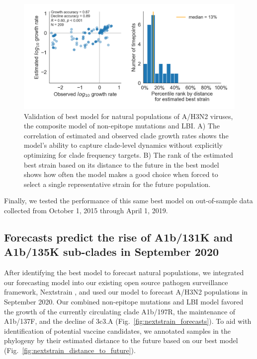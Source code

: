 \begin{figure}[ht]
  \begin{center}
  \includegraphics[width=\textwidth]{figures/validation-of-best-model-for-natural-populations.png}
  \caption{
  Validation of best model for natural populations of A/H3N2 viruses, the composite model of non-epitope mutations and LBI.
  A) The correlation of estimated and observed clade growth rates shows the model's ability to capture clade-level dynamics without explicitly optimizing for clade frequency targets.
  B) The rank of the estimated best strain based on its distance to the future in the best model shows how often the model makes a good choice when forced to select a single representative strain for the future population.
  }
  \label{fig:validation_of_best_model_for_natural_populations}
  \end{center}
\end{figure}

Finally, we tested the performance of this same best model on out-of-sample data collected from October 1, 2015 through April 1, 2019.

\subsection*{Forecasts predict the rise of A1b/131K and A1b/135K sub-clades in September 2020}

After identifying the best model to forecast natural populations, we integrated our forecasting model into our existing open source pathogen surveillance framework, Nextstrain \cite{Hadfield2018}, and used our model to forecast A/H3N2 populations in September 2020.
Our combined non-epitope mutations and LBI model favored the growth of the currently circulating clade A1b/197R, the maintenance of A1b/137F, and the decline of 3c3.A (Fig.~\ref{fig:nextstrain_forecasts}).
To aid with identification of potential vaccine candidates, we annotated samples in the phylogeny by their estimated distance to the future based on our best model (Fig.~\ref{fig:nextstrain_distance_to_future}).

